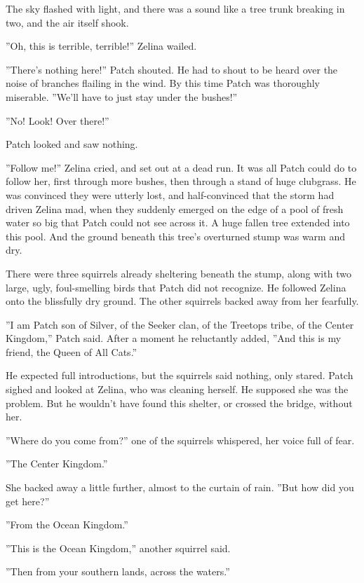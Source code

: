 \documentclass[11pt]{article}
\begin{document}
 The sky flashed with light, and there was a sound like a tree trunk breaking in two, and the air itself shook.\par
 ''Oh, this is terrible, terrible!'' Zelina wailed.\par
 ''There's nothing here!'' Patch shouted. He had to shout to be heard over the noise of branches flailing in the wind. By this time Patch was thoroughly miserable. ''We'll have to just stay under the bushes!''\par
 ''No! Look! Over there!''\par
 Patch looked and saw nothing.\par
 ''Follow me!'' Zelina cried, and set out at a dead run. It was all Patch could do to follow her, first through more bushes, then through a stand of huge clubgrass. He was convinced they were utterly lost, and half-convinced that the storm had driven Zelina mad, when they suddenly emerged on the edge of a pool of fresh water so big that Patch could not see across it. A huge fallen tree extended into this pool. And the ground beneath this tree's overturned stump was warm and dry.\par
 There were three squirrels already sheltering beneath the stump, along with two large, ugly, foul-smelling birds that Patch did not recognize. He followed Zelina onto the blissfully dry ground. The other squirrels backed away from her fearfully.\par
 ''I am Patch son of Silver, of the Seeker clan, of the Treetops tribe, of the Center Kingdom,'' Patch said. After a moment he reluctantly added, ''And this is my friend, the Queen of All Cats.''\par
 He expected full introductions, but the squirrels said nothing, only stared. Patch sighed and looked at Zelina, who was cleaning herself. He supposed she was the problem. But he wouldn't have found this shelter, or crossed the bridge, without her.\par
 ''Where do you come from?'' one of the squirrels whispered, her voice full of fear.\par
 ''The Center Kingdom.''\par
 She backed away a little further, almost to the curtain of rain. ''But how did you get here?''\par
 ''From the Ocean Kingdom.''\par
 ''This is the Ocean Kingdom,'' another squirrel said.\par
 ''Then from your southern lands, across the waters.''\par
\end{document}

